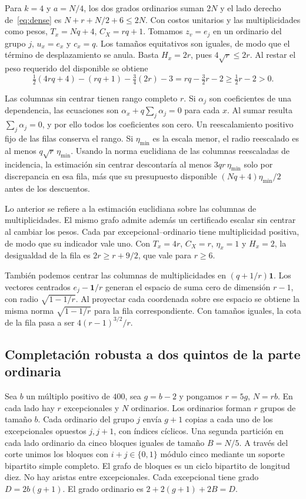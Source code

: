 \documentclass[11pt]{article}
\begin{document}
Para \(k=4\) y \(a=N/4\), los dos grados ordinarios suman \(2N\) y el lado derecho de~\eqref{eq:dense} es \(N+r+N/2+6\le2N\). Con costos unitarios y las multiplicidades como pesos, \(T_x=Nq+4\), \(C_X=rq+1\). Tomamos \(z_v=e_j\) en un ordinario del grupo \(j\), \(u_x=e_x\) y \(c_x=q\). Los tamaños equitativos son iguales, de modo que el término de desplazamiento se anula. Basta \(H_x=2r\), pues \(4\sqrt r\le2r\). Al restar el peso requerido del disponible se obtiene
\[
 \tfrac12(4rq+4)-(rq+1)-\tfrac34(2r)-3
 =rq-\tfrac32r-2\ge \tfrac12r-2>0 .
\]

Las columnas sin centrar tienen rango completo \(r\). Si \(\alpha_j\) son coeficientes de una dependencia, las ecuaciones son \(\alpha_x+q\sum_j\alpha_j=0\) para cada \(x\). Al sumar resulta \(\sum_j\alpha_j=0\), y por ello todos los coeficientes son cero. Un reescalamiento positivo fijo de las filas conserva el rango. Si \(\eta_{\min}\) es la escala menor, el radio reescalado es al menos \(q\sqrt r\,\eta_{\min}\). Usando la norma euclidiana de las columnas reescaladas de incidencia, la estimación sin centrar descontaría al menos \(3qr\,\eta_{\min}\) solo por discrepancia en esa fila, más que su presupuesto disponible \((Nq+4)\eta_{\min}/2\) antes de los descuentos.

Lo anterior se refiere a la estimación euclidiana sobre las columnas de multiplicidades. El mismo grafo admite además un certificado escalar sin centrar al cambiar los pesos. Cada par excepcional--ordinario tiene multiplicidad positiva, de modo que su indicador vale uno. Con \(T_x=4r\), \(C_X=r\), \(\eta_x=1\) y \(H_x=2\), la desigualdad de la fila es \(2r\ge r+9/2\), que vale para \(r\ge6\).

También podemos centrar las columnas de multiplicidades en \((q+1/r)\mathbf1\). Los vectores centrados \(e_j-\mathbf1/r\) generan el espacio de suma cero de dimensión \(r-1\), con radio \(\sqrt{1-1/r}\). Al proyectar cada coordenada sobre ese espacio se obtiene la misma norma \(\sqrt{1-1/r}\) para la fila correspondiente. Con tamaños iguales, la cota de la fila pasa a ser \(4(r-1)^{3/2}/r\).

\subsection{Completación robusta a dos quintos de la parte ordinaria}\label{sec:two-fifths}

Sea \(b\) un múltiplo positivo de \(400\), sea \(g=b-2\) y pongamos \(r=5g\), \(N=rb\). En cada lado hay \(r\) excepcionales y \(N\) ordinarios. Los ordinarios forman \(r\) grupos de tamaño \(b\). Cada ordinario del grupo \(j\) envía \(g+1\) copias a cada uno de los excepcionales opuestos \(j,j+1\), con índices cíclicos. Una segunda partición en cada lado ordinario da cinco bloques iguales de tamaño \(B=N/5\). A través del corte unimos los bloques con \(i+j\in\{0,1\}\) módulo cinco mediante un soporte bipartito simple completo. El grafo de bloques es un ciclo bipartito de longitud diez. No hay aristas entre excepcionales. Cada excepcional tiene grado \(D=2b(g+1)\). El grado ordinario es \(2+2(g+1)+2B=D\).
\end{document}
